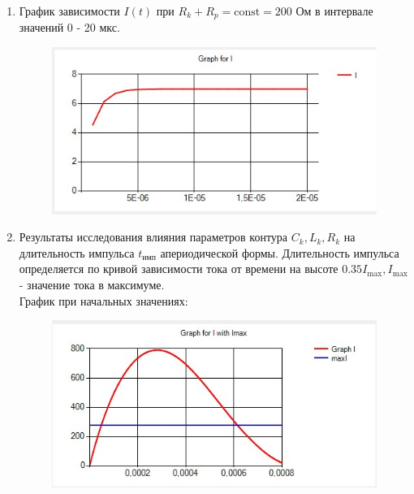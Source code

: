 \documentclass[14pt, a4paper]{extarticle}
\begin{document}
\begin{enumerate}
\begin{figure}[h]
	\end{figure}\par
	\item График зависимости $I(t)$ при $R_k + R_p = \text{const} = 200$ Ом в интервале значений 0 - 20 мкс.
	\begin{figure}[h]
		\centering
		\includegraphics[scale=1]{source/test3.jpg}
	\end{figure}\par
	\item Результаты исследования влияния параметров контура $C_k, L_k, R_k$ на длительность импульса $t_{\text{имп}}$ апериодической формы. Длительность импульса определяется по кривой зависимости тока от времени на высоте $0.35I_{\text{max}}, I_{\text{max}}$ - значение тока в максимуме.\\
	График при начальных значениях:
	\begin{figure}[h]
		\centering
		\includegraphics[scale=1]{source/test4.1.jpg}
	\end{figure}\par
	\newpage
	

\end{enumerate}
\end{document}
